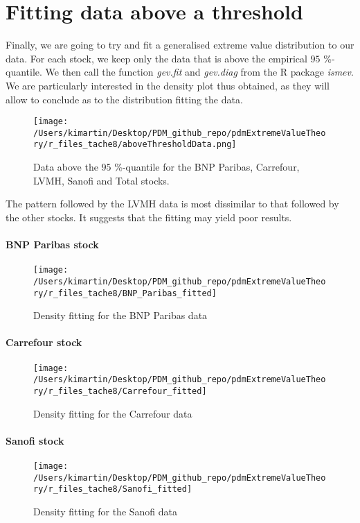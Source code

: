\section{Fitting data above a threshold}
Finally, we are going to try and fit a generalised extreme value distribution to our data. For each stock, we keep only the data that is above the empirical $95$ \%-quantile. We then call the function \textit{gev.fit} and \textit{gev.diag} from the R package \textit{ismev}. We are particularly interested in the density plot thus obtained, as they will allow to conclude as to the distribution fitting the data.
\begin{figure}[h!]
	\centering
	\texttt{[image: /Users/kimartin/Desktop/PDM\_github\_repo/pdmExtremeValueTheory/r\_files\_tache8/aboveThresholdData.png]}
	\caption{Data above the  $95$ \%-quantile for the BNP Paribas, Carrefour, LVMH, Sanofi and Total stocks.}
	\label{fig:dataAboveThreshold}
\end{figure}
\clearpage
The pattern followed by the LVMH data is most dissimilar to that followed by the other stocks. It suggests that the fitting may yield poor results. 
\paragraph{BNP Paribas stock }
\begin{figure}[h!]
	\centering
	\texttt{[image: /Users/kimartin/Desktop/PDM\_github\_repo/pdmExtremeValueTheory/r\_files\_tache8/BNP\_Paribas\_fitted]}
	\caption{Density fitting for the BNP Paribas data \\}
	\label{fig:dataAboveThresholdBNPFitted}
\end{figure}
\paragraph{Carrefour stock }
\begin{figure}[h!]
	\centering
	\texttt{[image: /Users/kimartin/Desktop/PDM\_github\_repo/pdmExtremeValueTheory/r\_files\_tache8/Carrefour\_fitted]}
	\caption{Density fitting for the Carrefour data \\}
	\label{fig:dataAboveThresholdBNPFitted}
\end{figure}
\paragraph{Sanofi stock}
\begin{figure}[h!]
	\centering
	\texttt{[image: /Users/kimartin/Desktop/PDM\_github\_repo/pdmExtremeValueTheory/r\_files\_tache8/Sanofi\_fitted]}
	\caption{Density fitting for the Sanofi data \\}
	\label{fig:dataAboveThresholdSanofiFitted}
\end{figure}
